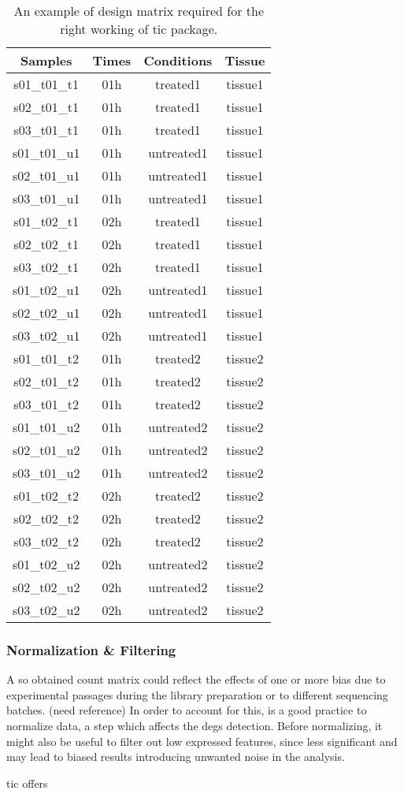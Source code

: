 \begin{table}[H]
\centering
\begin{tabular}{cccc}
\hline\hline
Samples & Times & Conditions & Tissue \\
\hline
s01\_t01\_t1 & 01h & treated1 & tissue1 \\
s02\_t01\_t1 & 01h & treated1 & tissue1 \\
s03\_t01\_t1 & 01h & treated1 & tissue1 \\
s01\_t01\_u1 & 01h & untreated1 & tissue1 \\
s02\_t01\_u1 & 01h & untreated1 & tissue1 \\
s03\_t01\_u1 & 01h & untreated1 & tissue1 \\
s01\_t02\_t1 & 02h & treated1 & tissue1 \\
s02\_t02\_t1 & 02h & treated1 & tissue1 \\
s03\_t02\_t1 & 02h & treated1 & tissue1 \\
s01\_t02\_u1 & 02h & untreated1 & tissue1 \\
s02\_t02\_u1 & 02h & untreated1 & tissue1 \\
s03\_t02\_u1 & 02h & untreated1 & tissue1 \\
s01\_t01\_t2 & 01h & treated2 & tissue2 \\
s02\_t01\_t2 & 01h & treated2 & tissue2 \\
s03\_t01\_t2 & 01h & treated2 & tissue2 \\
s01\_t01\_u2 & 01h & untreated2 & tissue2 \\
s02\_t01\_u2 & 01h & untreated2 & tissue2 \\
s03\_t01\_u2 & 01h & untreated2 & tissue2 \\
s01\_t02\_t2 & 02h & treated2 & tissue2 \\
s02\_t02\_t2 & 02h & treated2 & tissue2 \\
s03\_t02\_t2 & 02h & treated2 & tissue2 \\
s01\_t02\_u2 & 02h & untreated2 & tissue2 \\
s02\_t02\_u2 & 02h & untreated2 & tissue2 \\
s03\_t02\_u2 & 02h & untreated2 & tissue2 \\
\hline
\end{tabular}
\caption[\gls{tic} Design Matrix example]{An example of design matrix required for the right working of \gls{tic} package.}
\label{tab:ticorserdesmat}
\end{table}

\subsubsection{Normalization \& Filtering}
A so obtained count matrix could reflect the effects of one or more bias due to experimental passages during the library preparation or to different sequencing batches. (need reference)
In order to account for this, is a good practice to normalize data, a step which affects the \glspl{deg} detection\cite{Peixoto2015, Soneson2013d, Bullard2010}.
Before normalizing, it might also be useful to filter out low expressed features, since less significant and may lead to biased results introducing unwanted noise in the analysis. 

\gls{tic} offers 













